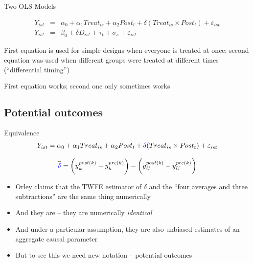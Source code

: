 \documentclass{beamer}
\begin{document}
\begin{frame}{Two OLS Models}

\begin{eqnarray}
Y_{ist} &=& \alpha_0 + \alpha_1 Treat_{is} + \alpha_2 Post_{t} + \delta (Treat_{is} \times Post_t) + \varepsilon_{ist} \\
Y_{ist} &=& \beta_0 + \delta D_{ist} + \tau_t + \sigma_s + \varepsilon_{ist}
\end{eqnarray}

\bigskip

First equation is used for simple designs when everyone is treated at once; second equation was used when different groups were treated at different times (``differential timing'')

\bigskip

First equation works; second one only sometimes works

\end{frame}


\subsection{Potential outcomes}

\begin{frame}{Equivalence}
$$Y_{ist} = \alpha_0 + \alpha_1 Treat_{is} + \alpha_2 Post_{t} + \textcolor{blue}{\delta} (Treat_{is} \times Post_t) + \varepsilon_{ist} $$

\bigskip

$$\widehat{\textcolor{blue}{\delta}} = \bigg ( \overline{y}_k^{post(k)} - \overline{y}_k^{pre(k)} \bigg ) - \bigg ( \overline{y}_U^{post(k)} - \overline{y}_U^{pre(k)} \bigg ) $$

\begin{itemize}
\item Orley claims that the TWFE estimator of $\delta$ and the ``four averages and three subtractions'' are the same thing numerically
\item And they are -- they are numerically \emph{identical}
\item And under a particular assumption, they are also unbiased estimates of an aggregate causal parameter
\item But to see this we need new notation -- potential outcomes
\end{itemize}

\end{frame}
\end{document}
